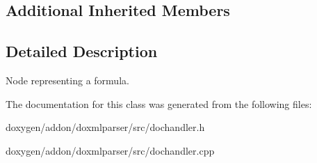 \subsection*{Additional Inherited Members}


\subsection{Detailed Description}
Node representing a formula. 



The documentation for this class was generated from the following files\+:\begin{DoxyCompactItemize}
\item 
doxygen/addon/doxmlparser/src/dochandler.\+h\item 
doxygen/addon/doxmlparser/src/dochandler.\+cpp\end{DoxyCompactItemize}
